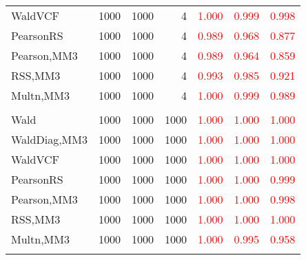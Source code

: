 \documentclass[
]{article}
\begin{document}
\begin{table}[H]
{\begin{tabular}[t]{lrrrrrr}
\hspace{1em}WaldVCF & 1000 & 1000 & 4 & \textcolor{red}{1.000} & \textcolor{red}{0.999} & \textcolor{red}{0.998}\\
\hspace{1em}PearsonRS & 1000 & 1000 & 4 & \textcolor{red}{0.989} & \textcolor{red}{0.968} & \textcolor{red}{0.877}\\
\hspace{1em}Pearson,MM3 & 1000 & 1000 & 4 & \textcolor{red}{0.989} & \textcolor{red}{0.964} & \textcolor{red}{0.859}\\
\hspace{1em}RSS,MM3 & 1000 & 1000 & 4 & \textcolor{red}{0.993} & \textcolor{red}{0.985} & \textcolor{red}{0.921}\\
\hspace{1em}Multn,MM3 & 1000 & 1000 & 4 & \textcolor{red}{1.000} & \textcolor{red}{0.999} & \textcolor{red}{0.989}\\
\addlinespace[0.3em]
\multicolumn{7}{l}{\textbf{1F 15V}}\\
\hspace{1em}Wald & 1000 & 1000 & 1000 & \textcolor{red}{1.000} & \textcolor{red}{1.000} & \vphantom{1} \textcolor{red}{1.000}\\
\hspace{1em}WaldDiag,MM3 & 1000 & 1000 & 1000 & \textcolor{red}{1.000} & \textcolor{red}{1.000} & \textcolor{red}{1.000}\\
\hspace{1em}WaldVCF & 1000 & 1000 & 1000 & \textcolor{red}{1.000} & \textcolor{red}{1.000} & \vphantom{1} \textcolor{red}{1.000}\\
\hspace{1em}PearsonRS & 1000 & 1000 & 1000 & \textcolor{red}{1.000} & \textcolor{red}{1.000} & \textcolor{red}{0.999}\\
\hspace{1em}Pearson,MM3 & 1000 & 1000 & 1000 & \textcolor{red}{1.000} & \textcolor{red}{1.000} & \textcolor{red}{0.998}\\
\hspace{1em}RSS,MM3 & 1000 & 1000 & 1000 & \textcolor{red}{1.000} & \textcolor{red}{1.000} & \textcolor{red}{1.000}\\
\hspace{1em}Multn,MM3 & 1000 & 1000 & 1000 & \textcolor{red}{1.000} & \textcolor{red}{0.995} & \textcolor{red}{0.958}\\
\addlinespace[0.3em]
\multicolumn{7}{l}{\textbf{2F 10V}}\\

\end{tabular}}
\end{table}
\end{document}
